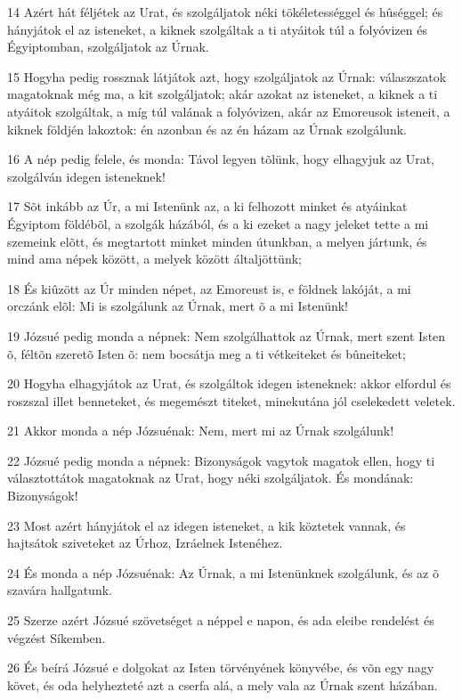 \par 14 Azért hát féljétek az Urat, és szolgáljatok néki tökéletességgel és hûséggel; és hányjátok el  az isteneket, a kiknek szolgáltak a ti atyáitok túl a folyóvizen és Égyiptomban, szolgáljatok az Úrnak.
\par 15 Hogyha pedig rossznak látjátok azt, hogy szolgáljatok az Úrnak: válaszszatok magatoknak még ma, a kit szolgáljatok; akár azokat az isteneket, a kiknek a ti atyáitok szolgáltak, a míg túl valának a folyóvizen, akár az Emoreusok isteneit, a kiknek földjén lakoztok: én azonban és az én házam az Úrnak szolgálunk.
\par 16 A nép pedig felele, és monda: Távol legyen tõlünk, hogy elhagyjuk az Urat, szolgálván idegen isteneknek!
\par 17 Sõt inkább az Úr, a mi Istenünk az, a ki felhozott minket és atyáinkat Égyiptom földébõl, a szolgák házából, és a ki ezeket a nagy jeleket tette a mi szemeink elõtt, és megtartott minket minden útunkban, a melyen jártunk, és mind ama népek között, a melyek között általjöttünk;
\par 18 És kiûzött az Úr minden népet, az Emoreust is, e földnek lakóját, a mi orczánk elõl: Mi is szolgálunk az Úrnak, mert õ a mi Istenünk!
\par 19 Józsué pedig monda a népnek: Nem szolgálhattok az Úrnak, mert szent Isten õ, féltõn szeretõ Isten õ: nem bocsátja meg a ti vétkeiteket és bûneiteket;
\par 20 Hogyha elhagyjátok az Urat, és szolgáltok idegen isteneknek: akkor elfordul és roszszal illet benneteket, és megemészt titeket, minekutána jól cselekedett veletek.
\par 21 Akkor monda a nép Józsuénak: Nem, mert mi az Úrnak szolgálunk!
\par 22 Józsué pedig monda a népnek: Bizonyságok vagytok magatok ellen, hogy ti választottátok magatoknak az Urat, hogy néki szolgáljatok. És mondának: Bizonyságok!
\par 23 Most azért hányjátok el az idegen isteneket, a kik köztetek vannak, és hajtsátok sziveteket az Úrhoz, Izráelnek Istenéhez.
\par 24 És monda a nép Józsuénak: Az Úrnak, a mi Istenünknek szolgálunk, és az õ szavára hallgatunk.
\par 25 Szerze azért Józsué szövetséget a néppel e napon, és ada eleibe rendelést és végzést Síkemben.
\par 26 És beírá Józsué e dolgokat az Isten törvényének könyvébe, és võn egy nagy követ, és oda helyhezteté azt a cserfa alá, a mely vala az Úrnak szent házában.
